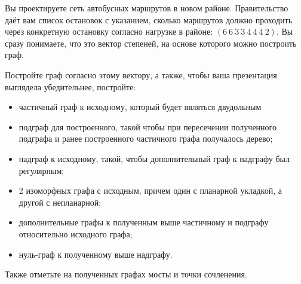 \question
Вы проектируете сеть автобусных маршрутов в новом районе. Правительство даёт вам список остановок с указанием, сколько маршрутов должно проходить через конкретную остановку согласно нагрузке в районе: $(6\ 6\ 3\ 3\ 4\ 4\ 4\ 2)$. Вы сразу понимаете, что это вектор степеней, на основе которого можно построить граф.

Постройте граф согласно этому вектору, а также, чтобы ваша презентация выглядела убедительнее, постройте:

\begin{itemize}
\item частичный граф к исходному, который будет являться двудольным
\item подграф для построенного, такой чтобы при пересечении полученного подграфа и ранее построенного частичного графа получалось дерево;
\item надграф к исходному, такой, чтобы дополнительный граф к надграфу был регулярным;
\item 2 изоморфных графа с исходным, причем один с планарной укладкой, а другой с непланарной;
\item дополнительные графы к полученным выше частичному и подграфу относительно исходного графа;
\item нуль-граф к полученному выше надграфу.
\end{itemize}

Также отметьте на полученных графах мосты и точки сочленения.
